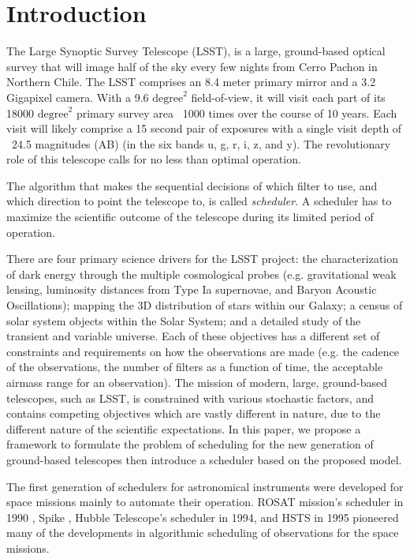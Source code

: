 \documentclass[12pt]{aastex62}
\theoremstyle{definition}
\begin{document}
\section{Introduction}
The Large Synoptic Survey Telescope (LSST), is a large,  ground-based optical survey that will image half of the sky every few nights from Cerro Pachon in Northern Chile. The LSST comprises an 8.4 meter  primary mirror and a 3.2 Gigapixel camera.  With a 9.6 $\text{degree}^2$ field-of-view, it will visit each part of its 18000 $\text{degree}^2$ primary survey area ~1000 times over the course of 10 years. Each visit will likely comprise a 15 second pair of exposures with a single visit depth of ~24.5 magnitudes (AB) (in the six bands u, g, r, i, z, and y). The revolutionary role of this telescope calls for no less than optimal operation. 

The algorithm that makes the sequential decisions of which filter to use, and which direction to point the telescope to, is called \textit{scheduler}. A scheduler has to maximize the scientific outcome of the telescope during its limited period of operation. 

There are four primary science drivers for the LSST project: the characterization of dark energy through the multiple cosmological probes (e.g. gravitational weak lensing, luminosity distances from Type Ia supernovae, and Baryon Acoustic Oscillations); mapping the 3D distribution of stars within our Galaxy; a census of solar system objects within the Solar System; and a detailed study of the transient and variable universe. Each of these objectives has a different set of constraints and requirements on how the observations are made (e.g. the cadence of the observations, the number of filters as a function of time, the acceptable airmass range for an observation). The mission of modern, large, ground-based telescopes, such as LSST, is constrained with various stochastic factors, and contains competing objectives which are vastly different in nature, due to the different nature of the scientific expectations. In this paper, we propose a framework to formulate the problem of scheduling for the new generation of ground-based telescopes then introduce a scheduler based on the proposed model.

The first generation of schedulers for astronomical instruments were developed for space missions mainly to automate their operation. ROSAT mission's scheduler in 1990 \citep{nowakovski1999using},  Spike \citep{johnston1994spike}, Hubble Telescope's scheduler in 1994, and HSTS \citep{muscettola1995automating} in 1995 pioneered many of the developments in algorithmic scheduling of observations for the space missions.
\end{document}
